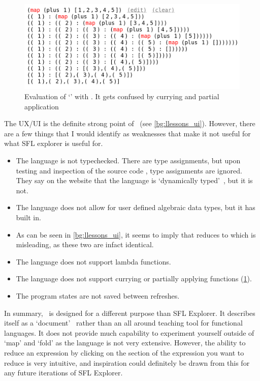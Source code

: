 \begin{figure}[t]
    \centering
    \includegraphics[width=0.75\linewidth]{images/LLessonsGoingWrong.png}
    \caption{Evaluation of `' with \llessons. It gets confused by currying and partial application}
    \label{bg:llessons_gets_confused}
\end{figure}

The UX/UI is the definite strong point of \llessons\ (see \ref{bg:llessons_ui}).  However, there are a few things that I would identify as weaknesses that make it not useful for what SFL explorer is useful for.

\begin{itemize}
    \item The language is not typechecked. There are type assignments, but upon testing and inspection of the source code \cite{lambdalessonsgithub}, type assignments are ignored. They say on the website that the language is `dynamically typed'~\cite{lambdalessons}, but it is not. 
    \item The language does not allow for user defined algebraic data types, but it has  built in. 
    \item As can be seen in \ref{bg:llessons_ui}, it seems to imply that  reduces to \sflinline{[x, y]} which is misleading, as these two are infact identical. 
    \item The language does not support lambda functions.
    \item The language does not support currying or partially applying functions (\ref{bg:llessons_gets_confused}).
    \item The program states are not saved between refreshes. 
\end{itemize} 

\noindent In summary, \llessons\ is designed for a different purpose than SFL Explorer. It describes itself as a `document'~\cite{lambdalessons} rather than an all around teaching tool for functional languages. It does not provide much capability to experiment yourself outside of `map' and `fold' as the language is not very extensive. However, the ability to reduce an expression by clicking on the section of the expression you want to reduce is very intuitive, and inspiration could definitely be drawn from this for any future iterations of SFL Explorer. 

